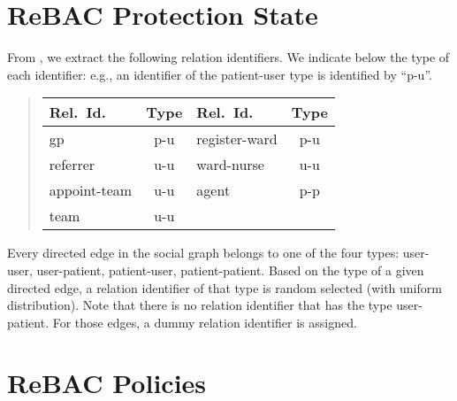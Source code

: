 \documentclass{acm_proc_article-sp}
\begin{document}
\section{R\MakeLowercase{e}BAC Protection State}
\label{app-edge-lab}

From \cite[\S 5]{Fong:2011}, we extract the following relation
identifiers. We indicate below the type of each identifier: e.g., an
identifier of the patient-user type is identified by ``p-u''.
\begin{quote}
\begin{tabular}{|l|c||l|c|} \hline
Rel.~Id. & Type & Rel.~Id. & Type \\ \hline
\textsf{gp} & p-u & 
\textsf{register-ward} & p-u  \\
\textsf{referrer} & u-u &
\textsf{ward-nurse} & u-u  \\
\textsf{appoint-team} & u-u & 
\textsf{agent} & p-p \\
\textsf{team} & u-u & & \\ \hline
\end{tabular}
\end{quote}
Every directed edge in the social graph belongs to one of the four
types: user-user, user-patient, patient-user, patient-patient.  Based
on the type of a given directed edge, a relation identifier of that
type is random selected (with uniform distribution).  Note that there
is no relation identifier that has the type user-patient.  For those
edges, a dummy relation identifier is assigned.



\section{R\MakeLowercase{e}BAC Policies}
\label{app-formulas}
\end{document}

